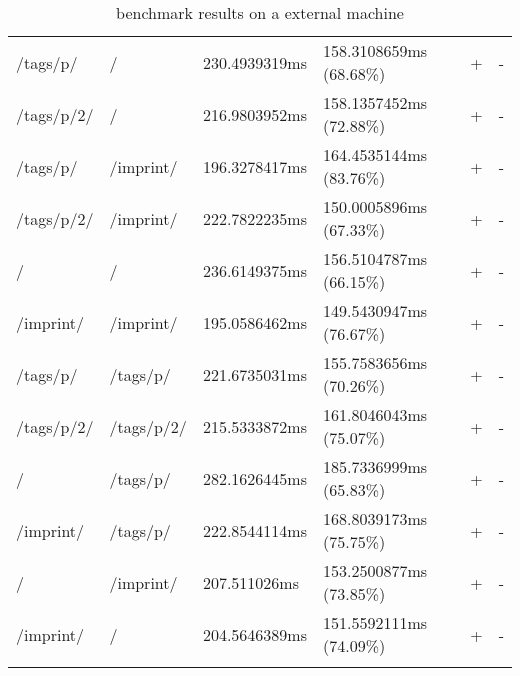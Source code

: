 \begin{center}
\begin{longtable}{llllll}
	\hline
	/tags/p/ & / & 230.4939319ms & 158.3108659ms (68.68\%) & + & - \\
	/tags/p/2/ & / & 216.9803952ms & 158.1357452ms (72.88\%) & + & - \\
	/tags/p/ & /imprint/ & 196.3278417ms & 164.4535144ms (83.76\%) & + & - \\
	/tags/p/2/ & /imprint/ & 222.7822235ms & 150.0005896ms (67.33\%) & + & - \\
	\hline
	/ & / & 236.6149375ms & 156.5104787ms (66.15\%) & + & - \\
	/imprint/ & /imprint/ & 195.0586462ms & 149.5430947ms (76.67\%) & + & - \\
	/tags/p/ & /tags/p/ & 221.6735031ms & 155.7583656ms (70.26\%) & + & - \\
	/tags/p/2/ & /tags/p/2/ & 215.5333872ms & 161.8046043ms (75.07\%) & + & - \\
	\hline
	/ & /tags/p/ & 282.1626445ms & 185.7336999ms (65.83\%) & + & - \\
	/imprint/ & /tags/p/ & 222.8544114ms & 168.8039173ms (75.75\%) & + & - \\
	\hline
	/ & /imprint/ & 207.511026ms & 153.2500877ms (73.85\%) & + & - \\
	/imprint/ & / & 204.5646389ms & 151.5592111ms (74.09\%) & + & - \\
	\hline
\caption{\selenium{} benchmark results on a external machine}
\label{tab:selenium_benchmark_results_external}
\end{longtable}
\end{center}





